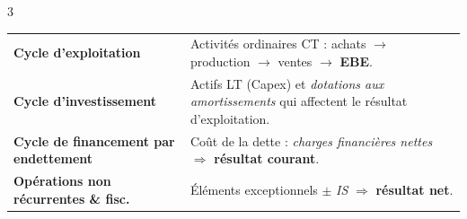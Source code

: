 \documentclass[10pt,landscape]{article}
\begin{document}
\begin{multicols}{3}
    \medskip
    \noindent\begin{tabularx}{\linewidth}{@{}>{\raggedright\arraybackslash}p{4.2cm} X@{}}
        \textbf{Cycle d'exploitation}                 &
        Activités ordinaires CT : achats $\to$ production $\to$ ventes $\to$ \textbf{EBE}.                   \\
        \textbf{Cycle d'investissement}               &
        Actifs LT (Capex) et \textit{dotations aux amortissements} qui affectent le résultat d'exploitation. \\
        \textbf{Cycle de financement par endettement} &
        Coût de la dette : \textit{charges financières nettes} $\Rightarrow$ \textbf{résultat courant}.      \\
        \textbf{Opérations non récurrentes \& fisc.}  &
        Éléments exceptionnels $\pm$ \textit{IS} $\Rightarrow$ \textbf{résultat net}.                        \\
    \end{tabularx}


\end{multicols}
\end{document}
